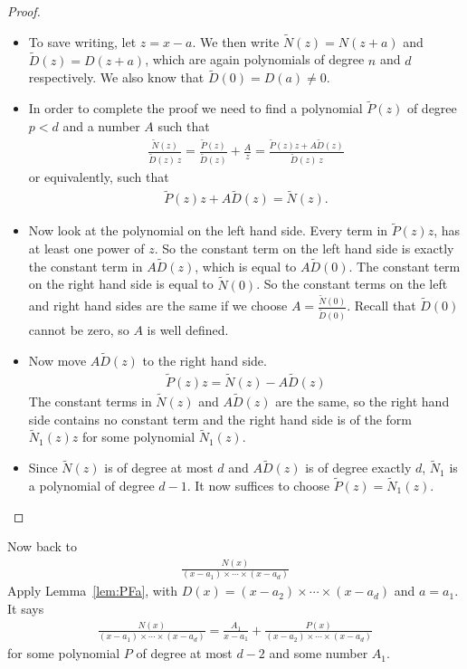 \begin{proof}
\begin{itemize}
 \item To save writing, let $z=x-a$. We then write $\tilde N(z)=N(z+a)$ and
$\tilde D(z)=D(z+a)$, which are again polynomials of degree $n$ and $d$ respectively. We
also know that $\tilde D(0)=D(a)\ne 0$.

\item In order to complete the proof we need to find a
polynomial $\tilde P(z)$ of degree $p<d$ and a number $A$ such that
\begin{align*}
\frac{\tilde N(z)}{\tilde D(z)\,z}
=\frac{\tilde P(z)}{\tilde D(z)}+\frac{A}{z}
=\frac{\tilde P(z) z+A\tilde D(z)}{\tilde D(z)\,z}
\end{align*}
or equivalently, such that
\begin{align*}
\tilde P(z) z+A\tilde D(z)=\tilde N(z).
\end{align*}
\item Now look at the polynomial on the left hand side. Every term in $\tilde P(z) z$,
has at least one power of $z$. So the constant term on the left hand
side is exactly the constant term in $A\tilde D(z)$, which is equal to
$A\tilde D(0)$. The constant term on the right hand side is equal to $\tilde N(0)$.
So the constant terms on the left and right hand sides are the same if
we choose $A=\frac{\tilde N(0)}{\tilde D(0)}$. Recall that $\tilde D(0)$
cannot be zero, so $A$ is well defined.

\item Now move $A\tilde D(z)$ to the right hand side.
\begin{align*}
\tilde P(z) z=\tilde N(z)-A\tilde D(z)
\end{align*}
The constant terms in $\tilde N(z)$ and $A\tilde D(z)$ are the same,
so the right hand side contains no constant term and the right
hand side is of the form $\tilde N_1(z) z$ for some polynomial $\tilde N_1(z)$.

\item Since $\tilde N(z)$ is of degree at most $d$ and $A\tilde D(z)$ is of degree
exactly $d$, $\tilde N_1$ is a polynomial of degree $d-1$. It now suffices to choose
$\tilde P(z)=\tilde N_1(z)$.
\end{itemize}
\end{proof}

Now back to
\begin{align*}
\frac{N(x)}{(x-a_1)\times\cdots\times (x-a_d)}
\end{align*}
Apply Lemma~\ref{lem:PFa}, with $D(x)=(x-a_2)\times\cdots\times (x-a_d)$ and
$a=a_1$.
It says
\begin{align*}
\frac{N(x)}{(x-a_1)\times\cdots\times (x-a_d)}
=\frac{A_1}{x-a_1}+\frac{P(x)}{(x-a_2)\times\cdots\times (x-a_d)}
\end{align*}
for some polynomial $P$ of degree at most $d-2$ and some number $A_1$.

